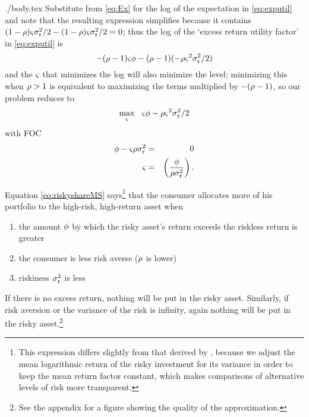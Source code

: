 \documentclass{bejournal}
\begin{document}
\begin{verbatimwrite}{./body.tex}
Substitute from \eqref{eq:Ex} for the log of the expectation in
\eqref{eq:exputil} and note that the resulting expression simplifies because it contains
${(1-\rho){\varsigma}\sigma_{\mathfrak{r}}^{2}/2-(1-\rho){\varsigma}\sigma_{\mathfrak{r}}^{2}/2}=0$; 
thus the log of the `excess return utility factor' in \eqref{eq:exputil} is
\begin{equation}
  -(\rho-1){\varsigma} \phi - (\rho-1)(- \rho {\varsigma}^{2}\sigma_{\mathfrak{r}}^{2}/2)
\end{equation}
and the ${\varsigma}$ that minimizes the log will also
minimize the level; minimizing this when $\rho>1$ is equivalent to
maximizing the terms multiplied by $-(\rho-1)$, so our problem
reduces to
\[
\max_{{\varsigma}}~~ {\varsigma} \phi -\rho{\varsigma}^{2}\sigma_{\mathfrak{r}}^{2}/2 
\]
with FOC
\begin{eqnarray}
         \phi-{\varsigma}\rho\sigma_{\mathfrak{r}}^{2}  & = & 0  \notag \\ 
{\varsigma} & = & \left(\frac{\phi}{\rho \sigma_{\mathfrak{r}}^{2}}\right)
. \label{eq:riskyshareMS}
\end{eqnarray}

Equation \eqref{eq:riskyshareMS} says\footnote{This expression differs
  slightly from that derived by \cite{cvAppendix}, because we adjust
  the mean logarithmic return of the risky investment for its variance
  in order to keep the mean return factor constant, which makes
  comparisons of alternative levels of risk more transparent.}  that the
consumer allocates more of his portfolio to the high-risk, high-return
asset when
\begin{enumerate}
\item the amount $\phi$ by which the risky
asset's return exceeds the riskless return is greater
\item the consumer is less risk averse ($\rho$ is lower)
\item riskiness $\sigma^{2}_{\mathfrak{r}}$ is less
\end{enumerate}
If there is no excess return, nothing will be put in the risky asset.  Similarly, if 
risk aversion or the variance of the risk is infinity, again nothing 
will be put in the risky asset.\footnote{See the appendix for a figure
  showing the quality of the approximation.}


\end{verbatimwrite}
\end{document}
